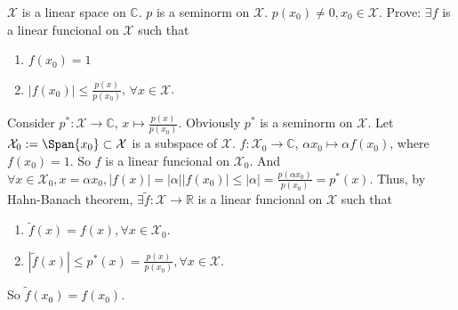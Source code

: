 \documentclass{ctexart}
\newif\ifpreface
\begin{document}
\large
\setlength{\baselineskip}{1.2em}
\ifpreface
    
\else
\maketitle
\fi
{}
\begin{problem}
\(\mathcal{X}\) is a linear space on \(\mathbb{C}\). $p$ is a seminorm on \(\mathcal{X}\). \(p(x_0) \neq 0, x_0 \in \mathcal{X}\).
Prove: \(\exists f\) is a linear funcional on \(\mathcal{X}\) such that
\begin{enumerate}
  \item \(f(x_0)=1\)
  \item \(|f(x_0)| \leq \frac{p(x)}{p(x_0)}\), \(\forall x \in \mathcal{X}\).
\end{enumerate}
\end{problem}
\begin{solution}
  Consider \(p^*: \mathcal{X} \to \mathbb{C}\), \(x \mapsto \frac{p(x)}{p(x_0)}\). Obviously \(p^*\) 
  is a seminorm on \(\mathcal{X}\). Let \(\mathcal{X}_0:=\Span\{x_0\} \subset \mathcal{X}\)
  is a subspace of \(\mathcal{X}\). \(f: \mathcal{X}_0 \to \mathbb{C}\), \(\alpha x_0 \mapsto \alpha f(x_0)\),
  where \(f(x_0)=1\). So \(f\) is a linear funcional on \(\mathcal{X}_0\). And \( \forall x \in \mathcal{X}_0, x= \alpha x_0, |f(x)|=|\alpha||f(x_0)| \leq |\alpha| = \frac{p(\alpha x_0)}{p(x_0)}=p^*(x)\).
  Thus, by Hahn-Banach theorem, \(\exists \tilde{f}: \mathcal{X} \to \mathbb{R}\) is a linear funcional on \(\mathcal{X}\) such that
  \begin{enumerate}
    \item \(\tilde{f}(x)=f(x), \forall x \in \mathcal{X}_0\).
    \item \(|\tilde{f}(x)| \leq p^*(x)=\frac{p(x)}{p(x_0)}, \forall x \in \mathcal{X}\).
  \end{enumerate}
  So \(\tilde{f}(x_0)=f(x_0)\). 
\end{solution}
\end{document}
